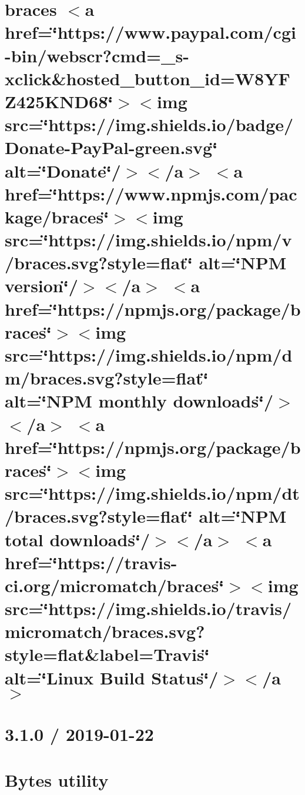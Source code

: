 \let\mypdfximage\pdfximage\def\pdfximage{\immediate\mypdfximage}\documentclass[twoside]{book}
\newcommand{\+}{\discretionary{\mbox{\scriptsize$\hookleftarrow$}}{}{}}
\begin{document}
\chapter{braces $<$a href=\char`\"{}https\+://www.\+paypal.\+com/cgi-\/bin/webscr?cmd=\+\_\+s-\/xclick\&hosted\+\_\+button\+\_\+id=\+W8\+Y\+F\+Z425\+K\+N\+D68\char`\"{}$>$$<$img src=\char`\"{}https\+://img.\+shields.\+io/badge/\+Donate-\/\+Pay\+Pal-\/green.\+svg\char`\"{} alt=\char`\"{}\+Donate\char`\"{}/$>$$<$/a$>$ $<$a href=\char`\"{}https\+://www.\+npmjs.\+com/package/braces\char`\"{}$>$$<$img src=\char`\"{}https\+://img.\+shields.\+io/npm/v/braces.\+svg?style=flat\char`\"{} alt=\char`\"{}\+N\+P\+M version\char`\"{}/$>$$<$/a$>$ $<$a href=\char`\"{}https\+://npmjs.\+org/package/braces\char`\"{}$>$$<$img src=\char`\"{}https\+://img.\+shields.\+io/npm/dm/braces.\+svg?style=flat\char`\"{} alt=\char`\"{}\+N\+P\+M monthly downloads\char`\"{}/$>$$<$/a$>$ $<$a href=\char`\"{}https\+://npmjs.\+org/package/braces\char`\"{}$>$$<$img src=\char`\"{}https\+://img.\+shields.\+io/npm/dt/braces.\+svg?style=flat\char`\"{} alt=\char`\"{}\+N\+P\+M total downloads\char`\"{}/$>$$<$/a$>$ $<$a href=\char`\"{}https\+://travis-\/ci.\+org/micromatch/braces\char`\"{}$>$$<$img src=\char`\"{}https\+://img.\+shields.\+io/travis/micromatch/braces.\+svg?style=flat\&label=\+Travis\char`\"{} alt=\char`\"{}\+Linux Build Status\char`\"{}/$>$$<$/a$>$}
\label{md__c_1__git_hub__p_r_o_y_e_c_t_o-_i_i_i-_g_o_t_rest-api-node-mysql_node_modules_braces__r_e_a_d_m_e}

\chapter{3.1.0 / 2019-\/01-\/22}
\label{md__c_1__git_hub__p_r_o_y_e_c_t_o-_i_i_i-_g_o_t_rest-api-node-mysql_node_modules_bytes__history}

\chapter{Bytes utility}
\label{md__c_1__git_hub__p_r_o_y_e_c_t_o-_i_i_i-_g_o_t_rest-api-node-mysql_node_modules_bytes__readme}

\end{document}
